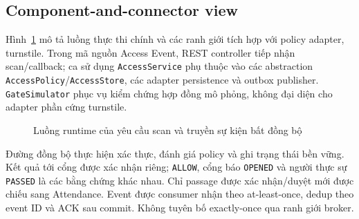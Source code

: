 \subsection{Component-and-connector view}
\label{subsec:connector-view}
Hình~\ref{fig:runtime-flow} mô tả luồng thực thi chính và các ranh giới tích hợp với policy adapter, turnstile. Trong mã nguồn Access Event, REST controller tiếp nhận scan/callback; ca sử dụng \texttt{AccessService} phụ thuộc vào các abstraction \texttt{AccessPolicy}/\texttt{AccessStore}, các adapter persistence và outbox publisher. \texttt{GateSimulator} phục vụ kiểm chứng hợp đồng mô phỏng, không đại diện cho adapter phần cứng turnstile.

\begin{figure}[htbp]
\centering
{}%
\caption{Luồng runtime của yêu cầu scan và truyền sự kiện bất đồng bộ}
\label{fig:runtime-flow}
\end{figure}

Đường đồng bộ thực hiện xác thực, đánh giá policy và ghi trạng thái bền vững. Kết quả tới cổng được xác nhận riêng; \texttt{ALLOW}, cổng báo \texttt{OPENED} và người thực sự \texttt{PASSED} là các bằng chứng khác nhau. Chỉ passage được xác nhận/duyệt mới được chiếu sang Attendance. Event được consumer nhận theo at-least-once, dedup theo event ID và ACK sau commit. Không tuyên bố exactly-once qua ranh giới broker.

